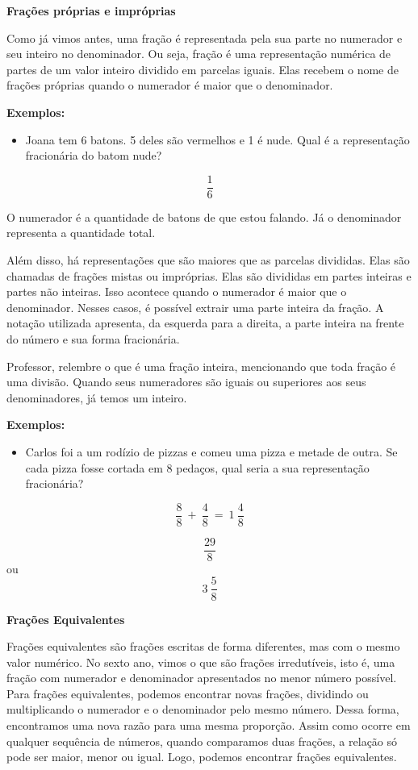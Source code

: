 \textbf{Frações próprias e impróprias}

Como já vimos antes, uma fração é representada pela sua parte no
numerador e seu inteiro no denominador. Ou seja, fração é uma
representação numérica de partes de um valor inteiro dividido em
parcelas iguais. Elas recebem o nome de frações próprias quando o
numerador é maior que o denominador.

\textbf{Exemplos:}

\begin{itemize}
\tightlist
\item
  Joana tem 6 batons. 5 deles são vermelhos e 1 é nude. Qual é a
  representação fracionária do batom nude?
\end{itemize}

\[\frac{1}{6}\]

O numerador é a quantidade de batons de que estou falando. Já o
denominador representa a quantidade total.

Além disso, há representações que são maiores que as parcelas divididas.
Elas são chamadas de frações mistas ou impróprias. Elas são divididas em
partes inteiras e partes não inteiras. Isso acontece quando o numerador
é maior que o denominador. Nesses casos, é possível extrair uma parte
inteira da fração. A notação utilizada apresenta, da esquerda para a
direita, a parte inteira na frente do número e sua forma fracionária.

Professor, relembre o que é uma fração inteira, mencionando que toda
fração é uma divisão. Quando seus numeradores são iguais ou superiores
aos seus denominadores, já temos um inteiro.

\textbf{Exemplos:}

\begin{itemize}
\tightlist
\item
  Carlos foi a um rodízio de pizzas e comeu uma pizza e metade de outra.
  Se cada pizza fosse cortada em 8 pedaços, qual seria a sua
  representação fracionária?
\end{itemize}

\[\frac{8}{8}\  + \ \frac{4}{8}\  = \ 1\ \frac{4}{8}\]

\[\frac{29}{8}\] ou \[3\ \frac{5}{8}\]

\textbf{Frações Equivalentes}

Frações equivalentes são frações escritas de forma diferentes, mas com o
mesmo valor numérico. No sexto ano, vimos o que são frações
irredutíveis, isto é, uma fração com numerador e denominador
apresentados no menor número possível. Para frações equivalentes,
podemos encontrar novas frações, dividindo ou multiplicando o numerador
e o denominador pelo mesmo número. Dessa forma, encontramos uma nova
razão para uma mesma proporção. Assim como ocorre em qualquer sequência
de números, quando comparamos duas frações, a relação só pode ser maior,
menor ou igual. Logo, podemos encontrar frações equivalentes.

